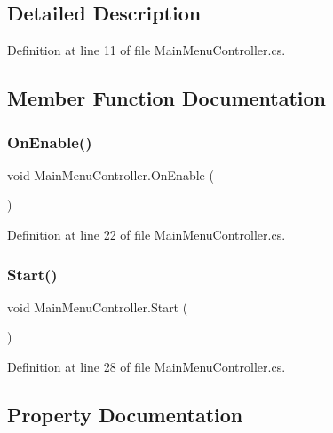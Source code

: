 \subsection{Detailed Description}


Definition at line 11 of file Main\+Menu\+Controller.\+cs.



\subsection{Member Function Documentation}
\mbox{\label{class_main_menu_controller_a7f6484c31265c993842c1a32b1ac9857}} 
\subsubsection{\texorpdfstring{On\+Enable()}{OnEnable()}}
{\footnotesize\ttfamily void Main\+Menu\+Controller.\+On\+Enable (\begin{DoxyParamCaption}{ }\end{DoxyParamCaption})}



Definition at line 22 of file Main\+Menu\+Controller.\+cs.

\mbox{\label{class_main_menu_controller_a732c505767ad16e6f4726f0e9643fa8a}} 
\subsubsection{\texorpdfstring{Start()}{Start()}}
{\footnotesize\ttfamily void Main\+Menu\+Controller.\+Start (\begin{DoxyParamCaption}{ }\end{DoxyParamCaption})}



Definition at line 28 of file Main\+Menu\+Controller.\+cs.



\subsection{Property Documentation}
\mbox{\label{class_main_menu_controller_a8c41d12d3444f11c92c93f9b2246f6ac}} 
